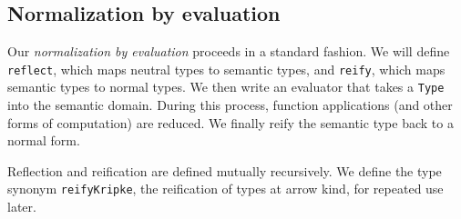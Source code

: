\documentclass[authoryear, acmsmall, screen, review, nonacm]{acmart}
\begin{document}
\subsection{Normalization by evaluation}

Our \emph{normalization by evaluation} proceeds in a standard fashion. We will define \verb!reflect!, which maps neutral types to semantic types, and \verb!reify!, which maps semantic types to normal types. We then write an evaluator that takes a \verb!Type! into the semantic domain. During this process, function applications (and other forms of computation) are reduced. We finally reify the semantic type back to a normal form.

Reflection and reification are defined mutually recursively. We define the type synonym \verb!reifyKripke!, the reification of types at arrow kind, for repeated use later.

\begin{code}%
\>[0]\AgdaSpace{}%
\AgdaSymbol{:}\AgdaSpace{}%
\AgdaSpace{}%
\AgdaSymbol{\{}\AgdaSymbol{\}}\AgdaSpace{}%
\AgdaSpace{}%
\AgdaSpace{}%
\AgdaSpace{}%
\AgdaSpace{}%
\AgdaSpace{}%
\AgdaSpace{}%
\AgdaSpace{}%
\<%
\\
\>[0]\AgdaSpace{}%
\AgdaSymbol{:}\AgdaSpace{}%
\AgdaSpace{}%
\AgdaSymbol{\{}\AgdaSymbol{\}}\AgdaSpace{}%
\AgdaSpace{}%
\AgdaSpace{}%
\AgdaSpace{}%
\AgdaSpace{}%
\AgdaSpace{}%
\AgdaSpace{}%
\AgdaSpace{}%
\<%
\\
\>[0]\AgdaSpace{}%
\AgdaSymbol{:}\AgdaSpace{}%
\AgdaSpace{}%
\AgdaSpace{}%
\AgdaSpace{}%
\AgdaSpace{}%
\AgdaSpace{}%
\AgdaSpace{}%
\AgdaSpace{}%
\AgdaSymbol{(}\AgdaSpace{}%
\AgdaSpace{}%
\AgdaSymbol{)}\<%
\end{code}
\end{document}
